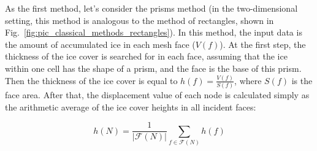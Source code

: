 \documentclass[
11pt,%
tightenlines,%
twoside,%
onecolumn,%
nofloats,%
nobibnotes,%
nofootinbib,%
superscriptaddress,%
noshowpacs,%
centertags]%
{revtex4}
\begin{document}
As the first method, let's consider the prisms method (in the two-dimensional setting, this method is analogous to the method of rectangles, shown in Fig.~\ref{fig:pic_classical_methods_rectangles}).
In this method, the input data is the amount of accumulated ice in each mesh face ($V(f)$).
At the first step, the thickness of the ice cover is searched for in each face, assuming that the ice within one cell has the shape of a prism, and the face is the base of this prism.
Then the thickness of the ice cover is equal to $h(f) = \frac{V(f)}{S(f)}$, where $S(f)$ is the face area.
After that, the displacement value of each node is calculated simply as the arithmetic average of the ice cover heights in all incident faces:

\begin{equation}
h(N) = \frac{1}{|\mathscr{F}(N)|} \sum_{f \in \mathscr{F}(N)}{h(f)}
\end{equation}
\end{document}
